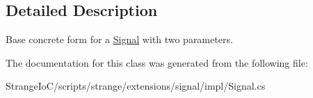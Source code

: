 \subsection{Detailed Description}
Base concrete form for a \hyperlink{classstrange_1_1extensions_1_1signal_1_1impl_1_1_signal}{Signal} with two parameters. 

The documentation for this class was generated from the following file\-:\begin{DoxyCompactItemize}
\item 
Strange\-Io\-C/scripts/strange/extensions/signal/impl/Signal.\-cs\end{DoxyCompactItemize}
